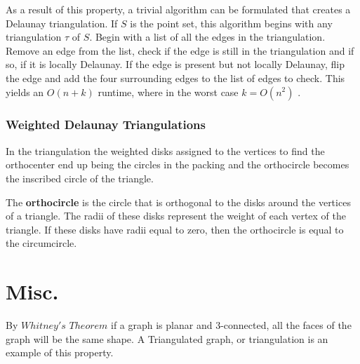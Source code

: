 \documentclass[11pt]{article}
\begin{document}
As a result of this property, a trivial algorithm can be formulated that creates a Delaunay triangulation. If $S$ is the point set, this algorithm begins with any triangulation $\tau$ of $S$. Begin with a list of all the edges in the triangulation. Remove an edge from the list, check if the edge is still in the triangulation and if so, if it is locally Delaunay. If the edge is present but not locally Delaunay, flip the edge and add the four surrounding edges to the list of edges to check. This yields an $O(n + k)$ runtime, where in the worst case $k = O(n^2)$ \cite{meshGeneration}.

\subsubsection{Weighted Delaunay Triangulations}

In the triangulation the weighted disks assigned to the vertices to find the orthocenter end up being the circles in the packing and the orthocircle becomes the inscribed circle of the triangle. 

The \textbf{orthocircle} is the circle that is orthogonal to the disks around the vertices of a triangle. The radii of these disks represent the weight of each vertex of the triangle. If these disks have radii equal to zero, then the orthocircle is equal to the circumcircle.

\section{Misc.}
By $Whitney's$ $Theorem$ if a graph is planar and 3-connected, all the faces of the graph will be the same shape. A Triangulated graph, or triangulation is an example of this property.



\end{document}
